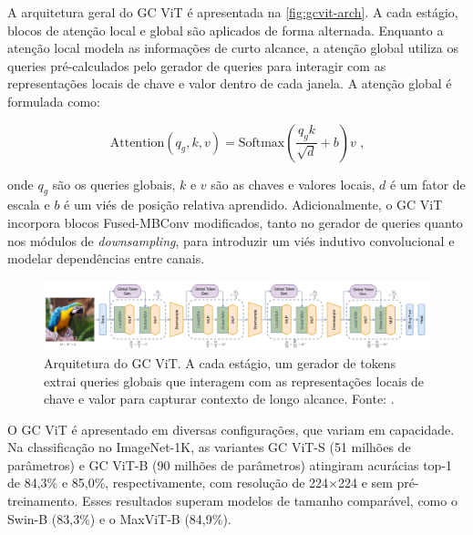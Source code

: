 A arquitetura geral do GC ViT é apresentada na \autoref{fig:gcvit-arch}. A cada estágio, blocos de atenção local e global são aplicados de forma alternada. Enquanto a atenção local modela as informações de curto alcance, a atenção global utiliza os queries pré-calculados pelo gerador de queries para interagir com as representações locais de chave e valor dentro de cada janela. A atenção global é formulada como:

\begin{equation}
    \text{Attention}(q_g, k, v) = \text{Softmax}\left(\frac{q_g k}{\sqrt{d}} + b\right)v \text{ ,}
\end{equation}

onde $q_g$ são os queries globais, $k$ e $v$ são as chaves e valores locais, $d$ é um fator de escala e $b$ é um viés de posição relativa aprendido. Adicionalmente, o GC ViT incorpora blocos Fused-MBConv modificados, tanto no gerador de queries quanto nos módulos de \textit{downsampling}, para introduzir um viés indutivo convolucional e modelar dependências entre canais.

\begin{figure}[h]
    \centering
    \includegraphics[width=\linewidth]{figs/gcvit-arch.png}
    \caption{Arquitetura do GC ViT. A cada estágio, um gerador de tokens extrai queries globais que interagem com as representações locais de chave e valor para capturar contexto de longo alcance. Fonte: \cite{gcvit2022}.}
    \label{fig:gcvit-arch}
\end{figure}

O GC ViT é apresentado em diversas configurações, que variam em capacidade. Na classificação no ImageNet-1K, as variantes GC ViT-S (51 milhões de parâmetros) e GC ViT-B (90 milhões de parâmetros) atingiram acurácias top-1 de 84,3\% e 85,0\%, respectivamente, com resolução de 224×224 e sem pré-treinamento. Esses resultados superam modelos de tamanho comparável, como o Swin-B (83,3\%) e o MaxViT-B (84,9\%).


